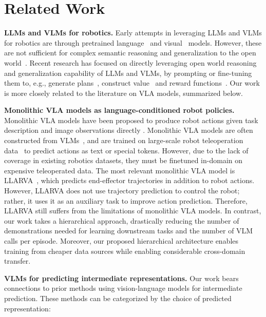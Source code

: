 \section{Related Work}
\textbf{LLMs and VLMs for robotics.} 
Early attempts in leveraging LLMs and VLMs for robotics are through pretrained language~\citep{jang2022bc,shridhar2023perceiver,singh2023progprompt} and visual~\citep{shah2021rrl,parisi2022unsurprising,nair2023r3m,ma2023vip} models. However, these are not sufficient for complex semantic reasoning and generalization to the open world~\citep{brohan2022rt,zitkovich2023rt}. Recent research has focused on directly leveraging open world reasoning and generalization capability of LLMs and VLMs, by 
prompting or fine-tuning them to, e.g., generate plans~\citep{huang2022language,huang2023inner,lin2023text2motion,liang2023code,singh2023progprompt,brohan2023can}, construct value~\citep{huang2023voxposer} and reward functions~\citep{kwon2023reward,RoboCLIP,yu2023language,ma2024eureka,wang2024rl}. Our work is more closely related to the literature on VLA models, summarized below.

\textbf{Monolithic VLA models as language-conditioned robot policies.}
Monolithic VLA models have been proposed to produce robot actions given task description and image observations directly \citep{brohan2022rt,jiang2023vima,zitkovich2023rt,team2024octo,kim2024openvla,radosavovic2023robot}. Monolithic VLA models are often constructed from VLMs~\citep{liu2024visual,bai2023qwen,driess2023palm,vila2024}, and are trained on large-scale robot teleoperation data~\citep{brohan2022rt,open_x_embodiment_rt_x_2023,khazatsky2024droid} to predict actions as text or special tokens. However, due to the lack of coverage in existing robotics datasets, they must be finetuned in-domain on expensive teleoperated data. The most relevant monolithic VLA model is LLARVA~\citep{niu2024llarva}, which predicts end-effector trajectories in addition to robot actions. However, LLARVA does not use trajectory prediction to control the robot; rather, it uses it as an auxiliary task to improve action prediction. Therefore, LLARVA still suffers from the limitations of monolithic VLA models. In contrast, our work takes a hierarchical approach, drastically reducing the number of demonstrations needed for learning downstream tasks and the number of VLM calls per episode. Moreover, our proposed hierarchical architecture enables training from cheaper data sources while enabling considerable cross-domain transfer. 

\textbf{VLMs for predicting intermediate representations.}
Our work bears connections to prior methods using vision-language models for intermediate prediction. These methods can be categorized by the choice of predicted representation:

